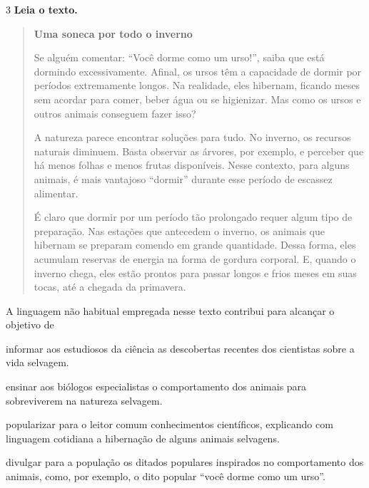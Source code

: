 \num{3} \textbf{Leia o texto.}

\begin{quote}
\textbf{Uma soneca por todo o inverno}

Se alguém comentar: ``Você dorme como um urso!'', saiba que está
dormindo excessivamente. Afinal, os ursos têm a capacidade de dormir por
períodos extremamente longos. Na realidade, eles hibernam, ficando meses
sem acordar para comer, beber água ou se higienizar. Mas como os ursos e
outros animais conseguem fazer isso?

A natureza parece encontrar soluções para tudo. No inverno, os recursos
naturais diminuem. Basta observar as árvores, por exemplo, e perceber
que há menos folhas e menos frutas disponíveis. Nesse contexto, para
alguns animais, é mais vantajoso ``dormir'' durante esse período de
escassez alimentar.

É claro que dormir por um período tão prolongado requer algum tipo de
preparação. Nas estações que antecedem o inverno, os animais que
hibernam se preparam comendo em grande quantidade. Dessa forma, eles
acumulam reservas de energia na forma de gordura corporal. E, quando o
inverno chega, eles estão prontos para passar longos e frios meses em
suas tocas, até a chegada da primavera.
\end{quote}


A linguagem não habitual empregada nesse texto contribui para alcançar o
objetivo de

\begin{escolha}

\item informar aos estudiosos da ciência as descobertas recentes dos
cientistas sobre a vida selvagem.

\item ensinar aos biólogos especialistas o comportamento dos animais para
sobreviverem na natureza selvagem.

\item popularizar para o leitor comum conhecimentos científicos, explicando
com linguagem cotidiana a hibernação de alguns animais selvagens.

\item divulgar para a população os ditados populares inspirados no
comportamento dos animais, como, por exemplo, o dito popular ``você
dorme como um urso''.
\end{escolha}

